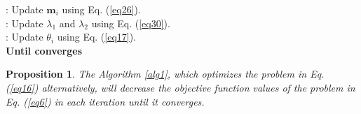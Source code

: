 \documentclass[10pt,journal,compsoc]{IEEEtran}
\newtheorem{theorem}{Proposition}
\begin{document}
\begin{algorithm}[!t]
{\begin{algorithmic}
: Update $\mathbf{m}_i$ using Eq. (\ref{eq26}).
\\
: Update $\lambda_1$ and $\lambda_2$ using Eq. (\ref{eq30}).
\\
: Update $\theta_i$ using Eq. (\ref{eq17}).
\\
\STATE \textbf{Until converges}
\end{algorithmic}}
\end{algorithm}



\begin{theorem} \label{proposition3}
The Algorithm \ref{alg1}, which optimizes the problem in Eq. (\ref{eq16}) alternatively, will decrease the objective function values of the problem in Eq. (\ref{eq6}) in each iteration until it converges.
\end{theorem}
\end{document}
